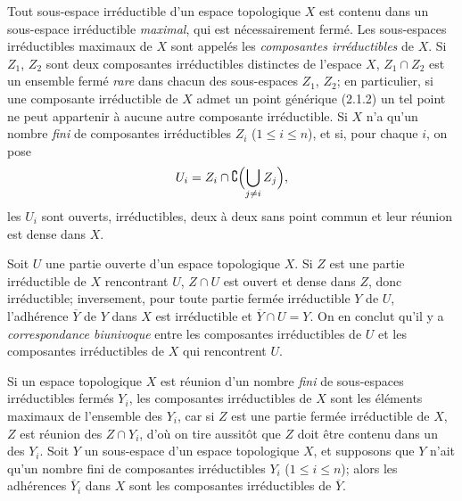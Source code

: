 \begin{env}[2.1.6]
\label{0.2.1.6-fr}
Tout sous-espace irréductible d'un espace topologique $X$ est contenu dans un
sous-espace irréductible \emph{maximal}, qui est nécessairement fermé. Les
sous-espaces irréductibles maximaux de $X$ sont appelés les \emph{composantes
irréductibles} de $X$. Si $Z_1$, $Z_2$ sont deux composantes irréductibles
distinctes de l'espace $X$, $Z_1\cap Z_2$ est un ensemble fermé \emph{rare}
dans chacun des sous-espaces $Z_1$, $Z_2$; en particulier, si une composante
irréductible de $X$ admet un point générique (2.1.2) un tel point ne peut
appartenir à aucune autre composante irréductible. Si $X$ n'a qu'un nombre
\emph{fini} de composantes irréductibles $Z_i$ ($1\leq i\leq n$), et si, pour
chaque $i$, on pose
\[
  U_i=Z_i\cap\complement\Bigl(\bigcup_{j\neq i}Z_j\Bigr),
\]
les $U_i$ sont ouverts, irréductibles, deux à deux sans point commun et leur
réunion est dense dans $X$.

Soit $U$ une partie ouverte d'un espace topologique $X$. Si $Z$ est une partie
irréductible de $X$ rencontrant $U$, $Z\cap U$ est ouvert et dense dans $Z$,
donc irréductible; inversement, pour toute partie fermée irréductible $Y$ de
$U$, l'adhérence $\overline Y$ de $Y$ dans $X$ est irréductible et
$\overline Y\cap U=Y$. On en conclut qu'il y a \emph{correspondance
biunivoque} entre les composantes irréductibles de $U$ et les composantes
irréductibles de $X$ qui rencontrent $U$.
\end{env}

\begin{env}[2.1.7]
\label{0.2.1.7-fr}
Si un espace topologique $X$ est réunion d'un nombre \emph{fini} de
sous-espaces irréductibles fermés $Y_i$, les composantes irréductibles de $X$
sont les éléments maximaux de l'ensemble des $Y_i$, car si $Z$ est une partie
fermée irréductible de $X$, $Z$ est réunion des $Z\cap Y_i$, d'où on tire
aussitôt que $Z$ doit être contenu dans un des $Y_i$. Soit $Y$ un sous-espace
d'un espace topologique $X$, et supposons que $Y$ n'ait qu'un nombre fini de
composantes irréductibles $Y_i$ ($1\leq i\leq n$); alors les adhérences
$\overline{Y}_i$ dans $X$ sont les composantes irréductibles de $\overline Y$.
\end{env}

